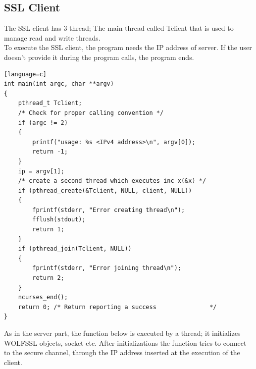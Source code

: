 \documentclass[a4paper,12pt]{report}
\begin{document}
\subsection{SSL Client}
The SSL client has 3 thread; The main thread called Tclient that is used to manage read and write threads.
\\To execute the SSL client, the program needs the IP address of server. If the user doesn't provide it during the program calls, the program ends. 
\begin{lstlisting}[caption={int main() of SSL client},captionpos=b][language=c]
int main(int argc, char **argv)
{
    pthread_t Tclient;
    /* Check for proper calling convention */
    if (argc != 2)
    {
        printf("usage: %s <IPv4 address>\n", argv[0]);
        return -1;
    }
    ip = argv[1];
    /* create a second thread which executes inc_x(&x) */
    if (pthread_create(&Tclient, NULL, client, NULL))
    {
        fprintf(stderr, "Error creating thread\n");
        fflush(stdout);
        return 1;
    }
    if (pthread_join(Tclient, NULL))
    {
        fprintf(stderr, "Error joining thread\n");
        return 2;
    }
    ncurses_end();
    return 0; /* Return reporting a success               */
}
\end{lstlisting}
As in the server part, the function below is executed by a thread; it initializes WOLFSSL objects, socket etc. After initializations the function tries to connect to the secure channel, through the IP address inserted at the execution of the client.
\end{document}
